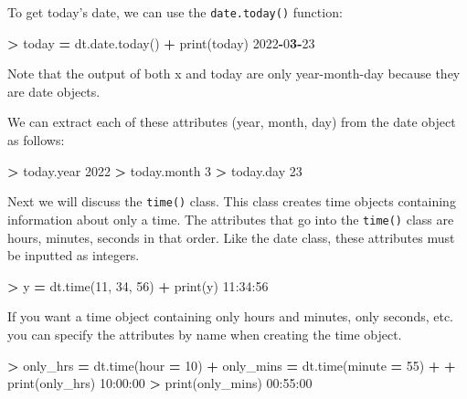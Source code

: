 \documentclass[
]{book}
\newenvironment{Shaded}{\begin{snugshade}}{\end{snugshade}}
\newcommand{\BuiltInTok}[1]{#1}
\newcommand{\DecValTok}[1]{\textcolor[rgb]{0.00,0.00,0.81}{#1}}
\newcommand{\ErrorTok}[1]{\textcolor[rgb]{0.64,0.00,0.00}{\textbf{#1}}}
\newcommand{\NormalTok}[1]{#1}
\newcommand{\OperatorTok}[1]{\textcolor[rgb]{0.81,0.36,0.00}{\textbf{#1}}}
\begin{document}
To get today's date, we can use the \texttt{date.today()} function:

\begin{Shaded}
\begin{Highlighting}[]
\OperatorTok{\textgreater{}}\NormalTok{ today }\OperatorTok{=}\NormalTok{ dt.date.today()}
\OperatorTok{+} \BuiltInTok{print}\NormalTok{(today)}
\DecValTok{2022}\OperatorTok{{-}}\DecValTok{0}\ErrorTok{3}\OperatorTok{{-}}\DecValTok{23}
\end{Highlighting}
\end{Shaded}

Note that the output of both x and today are only year-month-day because they are date objects.

We can extract each of these attributes (year, month, day) from the date object as follows:

\begin{Shaded}
\begin{Highlighting}[]
\OperatorTok{\textgreater{}}\NormalTok{ today.year }
\DecValTok{2022}
\OperatorTok{\textgreater{}}\NormalTok{ today.month}
\DecValTok{3}
\OperatorTok{\textgreater{}}\NormalTok{ today.day}
\DecValTok{23}
\end{Highlighting}
\end{Shaded}

Next we will discuss the \texttt{time()} class. This class creates time objects containing information about only a time. The attributes that go into the \texttt{time()} class are hours, minutes, seconds in that order. Like the date class, these attributes must be inputted as integers.

\begin{Shaded}
\begin{Highlighting}[]
\OperatorTok{\textgreater{}}\NormalTok{ y }\OperatorTok{=}\NormalTok{ dt.time(}\DecValTok{11}\NormalTok{, }\DecValTok{34}\NormalTok{, }\DecValTok{56}\NormalTok{)}
\OperatorTok{+} \BuiltInTok{print}\NormalTok{(y)}
\DecValTok{11}\NormalTok{:}\DecValTok{34}\NormalTok{:}\DecValTok{56}
\end{Highlighting}
\end{Shaded}

If you want a time object containing only hours and minutes, only seconds, etc. you can specify the attributes by name when creating the time object.

\begin{Shaded}
\begin{Highlighting}[]
\OperatorTok{\textgreater{}}\NormalTok{ only\_hrs }\OperatorTok{=}\NormalTok{ dt.time(hour }\OperatorTok{=} \DecValTok{10}\NormalTok{)}
\OperatorTok{+}\NormalTok{ only\_mins }\OperatorTok{=}\NormalTok{ dt.time(minute }\OperatorTok{=} \DecValTok{55}\NormalTok{)}
\OperatorTok{+} 
\OperatorTok{+} \BuiltInTok{print}\NormalTok{(only\_hrs)}
\DecValTok{10}\NormalTok{:}\DecValTok{00}\NormalTok{:}\DecValTok{00}
\OperatorTok{\textgreater{}} \BuiltInTok{print}\NormalTok{(only\_mins)}
\DecValTok{00}\NormalTok{:}\DecValTok{55}\NormalTok{:}\DecValTok{00}
\end{Highlighting}
\end{Shaded}
\end{document}
